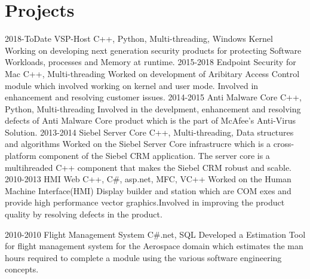 \documentclass[]{kartikkumar-cv}
\begin{document}
\section{Projects}

\begin{entrylist}
	\entry
	{2018-ToDate}
	{VSP-Host}
	{C++, Python, Multi-threading, Windows Kernel}
	{Working on developing next generation security products for protecting Software Workloads, processes and Memory at runtime.}
	 \entry
	{2015-2018}
	{Endpoint Security for Mac}
	{C++, Multi-threading}
	{Worked on development of Aribitary Access Control module which involved working on kernel and user mode.
	Involved in enhancement and resolving customer issues.}
  \entry
    {2014-2015}
    {Anti Malware Core}
    {C++, Python, Multi-threading}
    {Involved in the develpment, enhancement and resolving defects of Anti
    Malware Core product which is the part of McAfee's Anti-Virus Solution.}
  \entry
    {2013-2014}
    {Siebel Server Core}
    {C++, Multi-threading, Data structures and algorithms }
    {Worked on the Siebel Server Core infrastrucre which is a cross-platform
    component of the Siebel CRM application. The server core is a multihreaded
    C++ component that makes the Siebel CRM robust and scable.}
  \entry
    {2010-2013}
    {HMI Web}
    {C++, C\#, asp.net, MFC, VC++}
    {Worked on the Human Machine Interface(HMI) Display builder and station
    which are COM exes and provide high performance vector graphics.Involved in improving the product quality by resolving defects in the product.}
    
  \entry
  {2010-2010}
  {Flight Management System}
  {C\#.net, SQL}
  {Developed a Estimation Tool for flight management system for the
  Aerospace domain which estimates the man hours required to complete a
  module using the various software engineering concepts.}
    
\end{entrylist}
\end{document}
